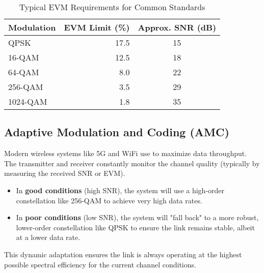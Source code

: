 \begin{table}[H]
    \centering
    \caption{Typical EVM Requirements for Common Standards}
    \label{tab:evm-requirements}
    \begin{tabular}{@{}lrc@{}}
        \toprule
        \tableheaderfont Modulation & \tableheaderfont EVM Limit (\%) & \tableheaderfont Approx. SNR (dB) \\
        \midrule
        QPSK & 17.5 & 15 \\
        16-QAM & 12.5 & 18 \\
        64-QAM & 8.0 & 22 \\
        256-QAM & 3.5 & 29 \\
        1024-QAM & 1.8 & 35 \\
        \bottomrule
    \end{tabular}
\end{table}


\subsection{Adaptive Modulation and Coding (AMC)}

Modern wireless systems like 5G and WiFi use  to maximize data throughput. The transmitter and receiver constantly monitor the channel quality (typically by measuring the received SNR or EVM).
\begin{itemize}
    \item In \textbf{good conditions} (high SNR), the system will use a high-order constellation like 256-QAM to achieve very high data rates.
    \item In \textbf{poor conditions} (low SNR), the system will "fall back" to a more robust, lower-order constellation like QPSK to ensure the link remains stable, albeit at a lower data rate.
\end{itemize}
This dynamic adaptation ensures the link is always operating at the highest possible spectral efficiency for the current channel conditions.


